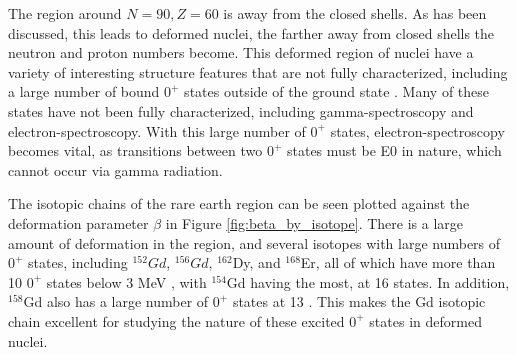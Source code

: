 The region around $N=90,Z=60$ is away from the closed shells. As has been discussed, this leads to deformed nuclei, the farther away from closed shells the neutron and proton numbers become. This deformed region of nuclei have a variety of interesting structure features that are not fully characterized, including a large number of bound $0^+$ states outside of the ground state \citep{meyer06:_zeroplus}. Many of these states have not been fully characterized, including gamma-spectroscopy and electron-spectroscopy. With this large number of $0^+$ states, electron-spectroscopy becomes vital, as transitions between two $0^+$ states must be E0 in nature, which cannot occur via gamma radiation.

The isotopic chains of the rare earth region can be seen plotted against the deformation parameter $\beta$ in Figure \ref{fig:beta_by_isotope}. There is a large amount of deformation in the region, and several isotopes with large numbers of $0^+$ states, including $^{152}Gd$, $^{156}Gd$, $^{162}$Dy, and $^{168}$Er, all of which have more than 10 $0^+$ states below 3 MeV \citep{meyer06:_zeroplus}, with $^{154}$Gd having the most, at 16 states. In addition, $^{158}$Gd also has a large number of $0^+$ states at 13 \citep{lesher02:_158gd}. This makes the Gd isotopic chain excellent for studying the nature of these excited $0^+$ states in deformed nuclei.
